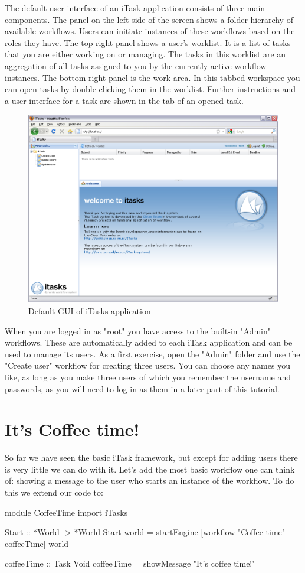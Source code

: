 \documentclass[a4paper,11pt]{article}
\begin{document}
The default user interface of an iTask application consists of three main components. The panel on the left side of the screen shows a folder hierarchy of available workflows. Users can initiate instances of these workflows based on the roles they have. The top right panel shows a user's worklist. It is a list of tasks that you are either working on or managing. The tasks in this worklist are an aggregation of all tasks assigned to you by the currently active workflow instances. The bottom right panel is the work area. In this tabbed workspace you can open tasks by double clicking them in the worklist. Further instructions and a user interface for a task are shown in the tab of an opened task.
\begin{figure}[h]
\centerline{\includegraphics[width=12cm]{GettingStarted-img/empty-browser.png}}
\caption{Default GUI of iTasks application} \label{empty-browser}
\end{figure}

When you are logged in as "root" you have access to the built-in "Admin" workflows. These are automatically added to each iTask application and can be used to manage its users. As a first exercise, open the "Admin" folder and use the "Create user" workflow for creating three users. You can choose any names you like, as long as you make three users of which you remember the username and passwords, as you will need to log in as them in a later part of this tutorial.

\section{It's Coffee time!}
So far we have seen the basic iTask framework, but except for adding users there is very little we can do with it. Let's add the most basic workflow one can think of: showing a message to the user who starts an instance of the workflow.
To do this we extend our code to:
\begin{CleanCodeN}
module CoffeeTime
import iTasks

Start :: *World -> *World
Start world = startEngine [workflow "Coffee time" coffeeTime] world

coffeeTime :: Task Void
coffeeTime = showMessage "It's coffee time!"
\end{CleanCodeN}
\end{document}
